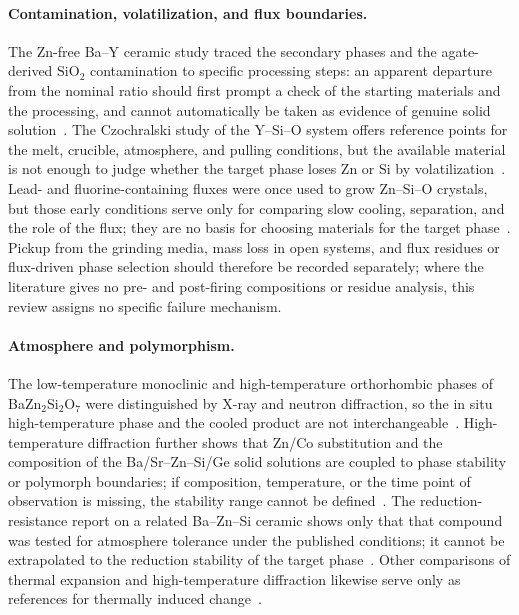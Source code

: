 \paragraph{Contamination, volatilization, and flux boundaries.}
The Zn-free Ba--Y ceramic study traced the secondary phases and the agate-derived \(\mathrm{SiO_2}\) contamination to specific processing steps: an apparent departure from the nominal ratio should first prompt a check of the starting materials and the processing, and cannot automatically be taken as evidence of genuine solid solution~\cite{yamane2024microstructure}. The Czochralski study of the Y--Si--O system offers reference points for the melt, crucible, atmosphere, and pulling conditions, but the available material is not enough to judge whether the target phase loses Zn or Si by volatilization~\cite{shoudu1999czochralski}. Lead- and fluorine-containing fluxes were once used to grow Zn--Si--O crystals, but those early conditions serve only for comparing slow cooling, separation, and the role of the flux; they are no basis for choosing materials for the target phase~\cite{giess1982zn2sio4}. Pickup from the grinding media, mass loss in open systems, and flux residues or flux-driven phase selection should therefore be recorded separately; where the literature gives no pre- and post-firing compositions or residue analysis, this review assigns no specific failure mechanism.

\paragraph{Atmosphere and polymorphism.}
The low-temperature monoclinic and high-temperature orthorhombic phases of BaZn$_2$Si$_2$O$_7$ were distinguished by X-ray and neutron diffraction, so the in situ high-temperature phase and the cooled product are not interchangeable~\cite{lin1999phase}. High-temperature diffraction further shows that Zn\slash Co substitution and the composition of the Ba\slash Sr--Zn--Si\slash Ge solid solutions are coupled to phase stability or polymorph boundaries; if composition, temperature, or the time point of observation is missing, the stability range cannot be defined~\cite{kerstan2013bazn2si2o7,thieme2016negative}. The reduction-resistance report on a related Ba--Zn--Si ceramic shows only that that compound was tested for atmosphere tolerance under the published conditions; it cannot be extrapolated to the reduction stability of the target phase~\cite{zou2019anti}. Other comparisons of thermal expansion and high-temperature diffraction likewise serve only as references for thermally induced change~\cite{kerstan2012thermal}.


